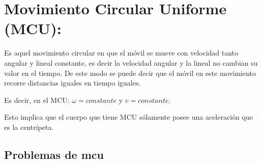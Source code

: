 \section{Movimiento Circular Uniforme (MCU):}

Es aquel movimiento circular en que el móvil se mueve con velocidad tanto angular y lineal constante, es decir la velocidad 
angular y la lineal no cambian su valor en el tiempo. De este modo se puede decir que el móvil en este movimiento recorre 
distancias iguales en tiempo iguales. 

\begin{tcolorbox}
Es decir, en el MCU: $\omega = constante$ y $v = constante.$
\end{tcolorbox}

Esto implica que el cuerpo que tiene MCU sólamente posee una aceleración que es la centrípeta.

\subsection{Problemas de mcu}

